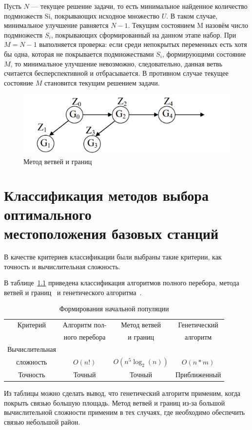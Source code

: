 Пусть $N$ --- текущее решение задачи, то есть минимальное найденное количество подмножеств Si, покрывающих исходное множество $U$. В таком случае, минимальное улучшение равняется $N-1$. Текущим состоянием M назовём число подмножеств $S_i$, покрывающих сформированный на данном этапе набор. При $M=N-1$ выполняется проверка: если среди непокрытых переменных есть хотя бы одна, которая не покрывается подмножествами $S_i$, формирующими состояние $M$, то минимальное улучшение невозможно, следовательно, данная ветвь считается бесперспективной и отбрасывается. В противном случае текущее состояние $M$ становится текущим решением задачи.

\captionsetup{justification=centering,singlelinecheck=false}
\begin{figure}[H]
	\centering
	\includegraphics[width=0.7\linewidth]{inc/img/mvig}
	\caption[]{Метод ветвей и границ}
	\label{fig:mvig}
\end{figure}

\chapter[Классификация методов выбора оптимального\\ местоположения базовых станций]{Классификация методов выбора оптимального \\местоположения базовых станций}

В качестве критериев классификации были выбраны такие критерии, как точность и вычислительная сложность.

В таблице~\ref{tbl:class} приведена классификация алгоритмов полного перебора, метода ветвей и границ~\cite{mvig_class} и генетического алгоритма~\cite{gen-hard}.
\captionsetup{justification=raggedright,singlelinecheck=false}
\begin{table}[H]
	\centering
	\begin{threeparttable}
		\caption{\label{tbl:class}Формирования начальной популяции}
		\begin{tabular}{|c|c|c|c|}
			\hline
			Критерий &Алгоритм пол-& Метод ветвей& Генетический \\
			&ного перебора& и границ&алгоритм\\\hline
			Вычислительная &&&\\
			сложность&$O(n!)$&$O(n^5\log_2(n))$&$O(n*m)$\\\hline
			Точность&Точный&Точный&Приближенный\\\hline
		\end{tabular}
	\end{threeparttable}
\end{table}

Из таблицы можно сделать вывод, что генетический алгоритм применим, когда покрыть связью большую площадь. Метод ветвей и границ из-за большой вычислительной сложности применим в тех случаях, где необходимо обеспечить связью небольшой район. 

